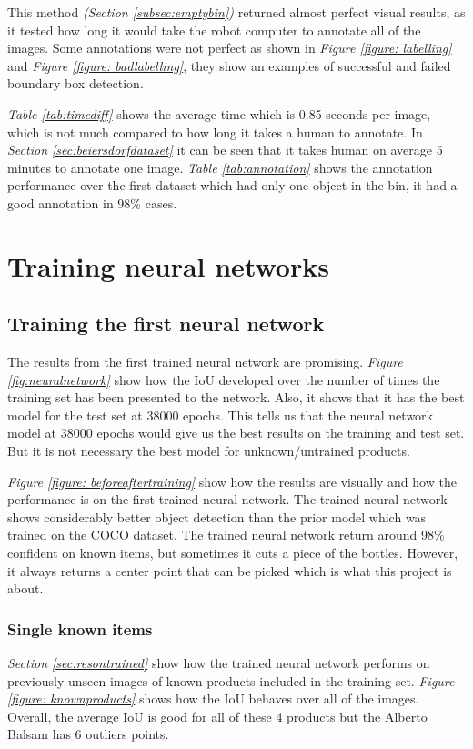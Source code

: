 This method \textit{(Section \ref{subsec:emptybin})} returned almost perfect visual results, as it tested how long it would take the robot computer to annotate all of the images. Some annotations were not perfect as shown in \textit{Figure \ref{figure: labelling}} and \textit{Figure \ref{figure: badlabelling}}, they show an examples of successful and failed boundary box detection.

\textit{Table \ref{tab:timediff}} shows the average time which is 0.85 seconds per image, which is not much compared to how long it takes a human to annotate. In \textit{Section \ref{sec:beiersdorfdataset}} it can be seen that it takes human on average 5 minutes to annotate one image. \textit{Table \ref{tab:annotation}} shows the annotation performance over the first dataset which had only one object in the bin, it had a good annotation in 98\% cases.



\section{Training neural networks} 
\subsection{Training the first neural network}
The results from the first trained neural network are promising. \textit{Figure \ref{fig:neuralnetwork}} show how the IoU developed over the number of times the training set has been presented to the network. Also, it shows that it has the best model for the test set at 38000 epochs. This tells us that the neural network model at 38000 epochs would give us the best results on the training and test set. But it is not necessary the best model for unknown/untrained products.

\textit{Figure \ref{figure: beforeaftertraining}} show how the results are visually and how the performance is on the first trained neural network. The trained neural network shows considerably better object detection than the prior model which was trained on the COCO dataset. The trained neural network return around 98\% confident on known items, but sometimes it cuts a piece of the bottles. However, it always returns a center point that can be picked which is what this project is about. 


\subsubsection{Single known items}
\textit{Section \ref{sec:resontrained}} show how the trained neural network performs on previously unseen images of known products included in the training set. \textit{Figure \ref{figure: knownproducts}} shows how the IoU behaves over all of the images. Overall, the average IoU is good for all of these 4 products but the Alberto Balsam has 6 outliers points.%


